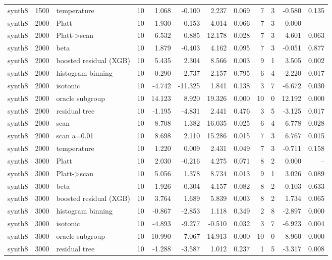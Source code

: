 \begin{tabular}{lllrrrrrrrrr}
synth8 & 1500 & temperature & 10 & 1.068 & -0.100 & 2.237 & 0.069 & 7 & 3 & -0.580 & 0.135 \\
synth8 & 2000 & Platt & 10 & 1.930 & -0.153 & 4.014 & 0.066 & 7 & 3 & 0.000 & -- \\
synth8 & 2000 & Platt->scan & 10 & 6.532 & 0.885 & 12.178 & 0.028 & 7 & 3 & 4.601 & 0.063 \\
synth8 & 2000 & beta & 10 & 1.879 & -0.403 & 4.162 & 0.095 & 7 & 3 & -0.051 & 0.877 \\
synth8 & 2000 & boosted residual (XGB) & 10 & 5.435 & 2.304 & 8.566 & 0.003 & 9 & 1 & 3.505 & 0.002 \\
synth8 & 2000 & histogram binning & 10 & -0.290 & -2.737 & 2.157 & 0.795 & 6 & 4 & -2.220 & 0.017 \\
synth8 & 2000 & isotonic & 10 & -4.742 & -11.325 & 1.841 & 0.138 & 3 & 7 & -6.672 & 0.030 \\
synth8 & 2000 & oracle subgroup & 10 & 14.123 & 8.920 & 19.326 & 0.000 & 10 & 0 & 12.192 & 0.000 \\
synth8 & 2000 & residual tree & 10 & -1.195 & -4.831 & 2.441 & 0.476 & 3 & 5 & -3.125 & 0.017 \\
synth8 & 2000 & scan & 10 & 8.708 & 1.382 & 16.035 & 0.025 & 6 & 4 & 6.778 & 0.028 \\
synth8 & 2000 & scan a=0.01 & 10 & 8.698 & 2.110 & 15.286 & 0.015 & 7 & 3 & 6.767 & 0.015 \\
synth8 & 2000 & temperature & 10 & 1.220 & 0.009 & 2.431 & 0.049 & 7 & 3 & -0.711 & 0.158 \\
synth8 & 3000 & Platt & 10 & 2.030 & -0.216 & 4.275 & 0.071 & 8 & 2 & 0.000 & -- \\
synth8 & 3000 & Platt->scan & 10 & 5.056 & 1.378 & 8.734 & 0.013 & 9 & 1 & 3.026 & 0.089 \\
synth8 & 3000 & beta & 10 & 1.926 & -0.304 & 4.157 & 0.082 & 8 & 2 & -0.103 & 0.633 \\
synth8 & 3000 & boosted residual (XGB) & 10 & 3.764 & 1.689 & 5.839 & 0.003 & 8 & 2 & 1.734 & 0.065 \\
synth8 & 3000 & histogram binning & 10 & -0.867 & -2.853 & 1.118 & 0.349 & 2 & 8 & -2.897 & 0.000 \\
synth8 & 3000 & isotonic & 10 & -4.893 & -9.277 & -0.510 & 0.032 & 3 & 7 & -6.923 & 0.004 \\
synth8 & 3000 & oracle subgroup & 10 & 10.990 & 7.067 & 14.913 & 0.000 & 10 & 0 & 8.960 & 0.000 \\
synth8 & 3000 & residual tree & 10 & -1.288 & -3.587 & 1.012 & 0.237 & 1 & 5 & -3.317 & 0.008 \\

\end{tabular}
